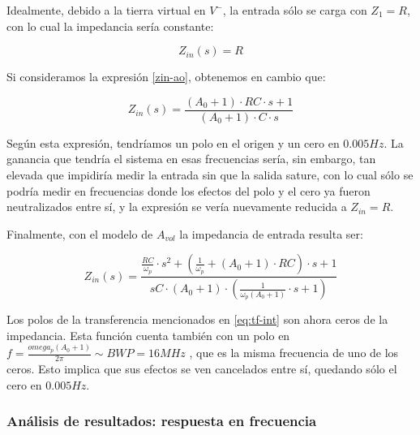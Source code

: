\documentclass[../../main.tex]{subfiles}
\begin{document}
Idealmente, debido a la tierra virtual en $V^-$, la entrada s\'olo se carga con $Z_1 = R$, con lo cual la impedancia ser\'ia constante:

\[ Z_{in}(s) =  R\]

Si consideramos la expresi\'on \ref{zin-ao}, obtenemos en cambio que:

\[ Z_{in}(s) = \frac{(A_0+1)\cdot RC \cdot s +1}{ (A_0 +1) \cdot C \cdot s }\]

Seg\'un esta expresi\'on, tendr\'iamos un polo en el origen y un cero en $0.005Hz$. La ganancia que tendr\'ia el sistema en esas frecuencias ser\'ia, sin embargo, tan elevada que impidir\'ia medir la entrada sin que la salida sature, con lo cual s\'olo se podr\'ia medir en frecuencias donde los efectos del polo y el cero ya fueron neutralizados entre s\'i, y la expresi\'on se ver\'ia nuevamente reducida a $Z_{in}=R$.\par

Finalmente, con el modelo de $A_{vol}$ la impedancia de entrada resulta ser:

\begin{equation}Z_{in}(s) = \frac{\frac{RC}{\omega_p} \cdot s^2 + \left(\frac{1}{\omega_p} + (A_0+1) \cdot RC\right) \cdot s +1}{sC \cdot (A_0+1) \cdot \left(\frac{1}{\omega_p (A_0+1)}\cdot s +1\right) } \end{equation}

Los polos de la transferencia mencionados en \ref{eq:tf-int} son ahora ceros de la impedancia. Esta funci\'on cuenta tambi\'en con un polo en $f = \frac{omega_p(A_0+1)}{2\pi} \sim BWP = 16MHz$ , que es la misma frecuencia de uno de los ceros. Esto implica que sus efectos se ven cancelados entre s\'i, quedando s\'olo el cero en $0.005Hz$.




\subsubsection{An\'alisis de resultados: respuesta en frecuencia}
\end{document}
